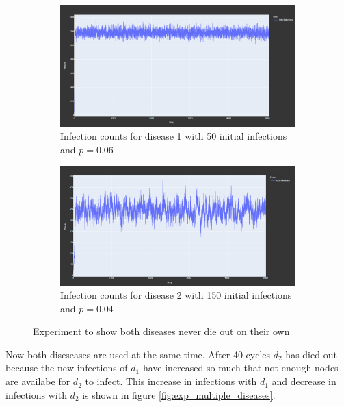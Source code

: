 \begin{figure}
    \centering
    \begin{subfigure}[b]{0.475\textwidth}
        \centering
        \includegraphics[width=\textwidth]{images/exp_multiple_diseases_d1.png}
        \caption[Network2]%
        {{\small Infection counts for disease 1 with 50 initial infections and $p = 0.06$}}   
    \end{subfigure}
    \hfill
    \begin{subfigure}[b]{0.475\textwidth}  
        \centering 
        \includegraphics[width=\textwidth]{images/exp_multiple_diseases_d2.png}
        \caption[]%
        {{\small Infection counts for disease 2 with 150 initial infections and $p = 0.04$}}    
    \end{subfigure}
    \caption[Experiment to show both diseases never die out on their own]
    {\small Experiment to show both diseases never die out on their own} 
    \label{fig:exp_multiple_diseases_individual}
\end{figure}

Now both diseseases are used at the same time. After 40 cycles $d_2$ has died out because the new infections of $d_1$ have increased so much that not enough nodes are availabe for $d_2$ to infect. This increase in infections with $d_1$ and decrease in infections with $d_2$ is shown in figure \ref{fig:exp_multiple_diseases}.

